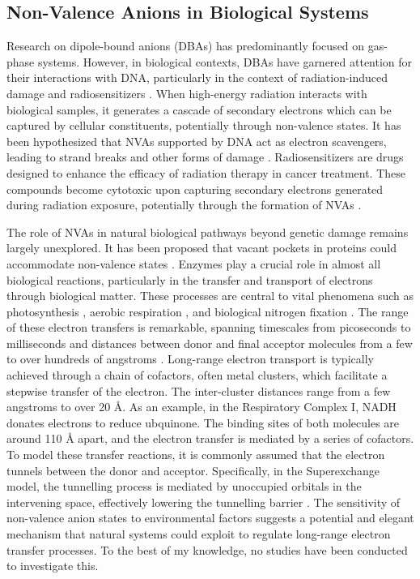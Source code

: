 \subsection{Non-Valence Anions in Biological Systems}

Research on dipole-bound anions (DBAs) has predominantly focused on gas-phase systems. However, in biological contexts, DBAs have garnered attention for their interactions with DNA, particularly in the context of radiation-induced damage and radiosensitizers \cite{gu2012interactions,narayanan2023secondary,sedmidubska2024interaction}.
When high-energy radiation interacts with biological samples, it generates a cascade of secondary electrons which can be captured by cellular constituents, potentially through non-valence states. It has been hypothesized that NVAs supported by DNA act as electron scavengers, leading to strand breaks and other forms of damage \cite{gu2012interactions,narayanan2023secondary,dutta2015electron,narayanan2024electron,sommerfeld2005dipole}.
Radiosensitizers are drugs designed to enhance the efficacy of radiation therapy in cancer treatment. These compounds become cytotoxic upon capturing secondary electrons generated during radiation exposure, potentially through the formation of NVAs \cite{sedmidubska2024interaction}.

The role of NVAs in natural biological pathways beyond genetic damage remains largely unexplored. It has been proposed that vacant pockets in proteins could accommodate non-valence states \cite{castellani2019stability}. Enzymes play a crucial role in almost all biological reactions, particularly in the transfer and transport of electrons through biological matter. These processes are central to vital phenomena such as photosynthesis \cite{mitchell1961coupling}, aerobic respiration \cite{wikstrom1977proton}, and biological nitrogen fixation \cite{rutledge2020electron}. The range of these electron transfers is remarkable, spanning timescales from picoseconds to milliseconds and distances between donor and final acceptor molecules from a few to over hundreds of angstroms \cite{gray1996electron,blumberger2015recent}. Long-range electron transport is typically achieved through a chain of cofactors, often metal clusters, which facilitate a stepwise transfer of the electron. The inter-cluster distances range from a few angstroms to over 20 \r{A}. As an example, in the Respiratory Complex I\cite{ernster1995biochemical}, NADH donates electrons to reduce ubquinone. The binding sites of both molecules are around 110 \r{A} apart, and the electron transfer is mediated by a series of cofactors. To model these transfer reactions, it is commonly assumed that the electron tunnels between the donor and acceptor. Specifically, in the Superexchange model, the tunnelling process is mediated by unoccupied orbitals in the intervening space, effectively lowering the tunnelling barrier \cite{blumberger2015recent}. The sensitivity of non-valence anion states to environmental factors suggests a potential and elegant mechanism that natural systems could exploit to regulate long-range electron transfer processes. To the best of my knowledge, no studies have been conducted to investigate this.

